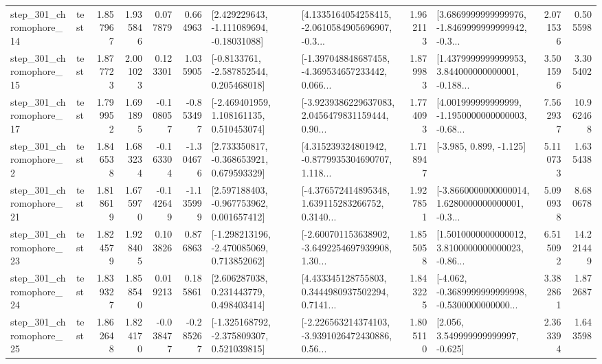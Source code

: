\begin{tabular}{llrrrrllrlrr}
  step\_301\_chromophore\_14 &      test &      1.857967 &    1.935846 &      0.077879 &  0.664963 &    [2.429229643, -1.111089694, -0.18031088] &  [4.1335164054258415, -2.0610584905696907, -0.3... &       1.962113 &  [3.6869999999999976, -1.8469999999999942, -0.3... &            2.071536 &          0.505598 \\
  step\_301\_chromophore\_15 &      test &      1.877723 &    2.001023 &      0.123301 &  1.035905 &     [-0.8133761, -2.587852544, 0.205468018] &  [-1.397048848687458, -4.369534657233442, 0.066... &       1.879983 &  [1.4379999999999953, 3.844000000000001, -0.188... &            3.501596 &          3.305402 \\
  step\_301\_chromophore\_17 &      test &      1.799952 &    1.691895 &     -0.108057 & -0.853497 &    [-2.469401959, 1.108161135, 0.510453074] &  [-3.9239386229637083, 2.0456479831159444, 0.90... &       1.774093 &  [4.001999999999999, -1.1950000000000003, -0.68... &            7.562937 &         10.962468 \\
   step\_301\_chromophore\_2 &      test &      1.846538 &    1.683234 &     -0.163304 & -1.304676 &    [2.733350817, -0.368653921, 0.679593329] &  [4.315239324801942, -0.8779935304690707, 1.118... &       1.718947 &                            [-3.985, 0.899, -1.125] &            5.110733 &          1.635438 \\
  step\_301\_chromophore\_21 &      test &      1.818619 &    1.675970 &     -0.142649 & -1.135999 &    [2.597188403, -0.967753962, 0.001657412] &  [-4.376572414895348, 1.639115283266752, 0.3140... &       1.927851 &  [-3.8660000000000014, 1.6280000000000001, -0.3... &            5.090938 &          8.680678 \\
  step\_301\_chromophore\_23 &      test &      1.824579 &    1.928405 &      0.103826 &  0.876863 &   [-1.298213196, -2.470085069, 0.713852062] &  [-2.600701153638902, -3.6492254697939908, 1.30... &       1.855058 &  [1.5010000000000012, 3.8100000000000023, -0.86... &            6.515092 &         14.221449 \\
  step\_301\_chromophore\_24 &      test &      1.839327 &    1.858540 &      0.019213 &  0.185861 &     [2.606287038, 0.231443779, 0.498403414] &  [4.433345128755803, 0.3444980937502294, 0.7141... &       1.843225 &  [-4.062, -0.3689999999999998, -0.5300000000000... &            3.382861 &          1.872687 \\
  step\_301\_chromophore\_25 &      test &      1.862648 &    1.824170 &     -0.038477 & -0.285267 &   [-1.325168792, -2.375809307, 0.521039815] &  [-2.226563214374103, -3.9391026472430886, 0.56... &       1.805110 &                 [2.056, 3.549999999999997, -0.625] &            2.363394 &          1.643598 \\

\end{tabular}
